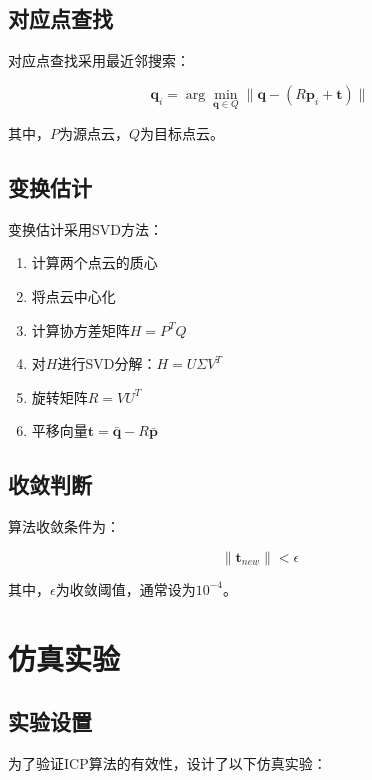 \documentclass[12pt,a4paper]{report}
\begin{document}
\subsection{对应点查找}

对应点查找采用最近邻搜索：

\begin{equation}
\mathbf{q}_i = \arg\min_{\mathbf{q} \in Q} \|\mathbf{q} - (R \mathbf{p}_i + \mathbf{t})\|
\end{equation}

其中，$P$为源点云，$Q$为目标点云。

\subsection{变换估计}

变换估计采用SVD方法：

\begin{enumerate}[itemsep=0pt]
    \item 计算两个点云的质心
    \item 将点云中心化
    \item 计算协方差矩阵$H = P^T Q$
    \item 对$H$进行SVD分解：$H = U \Sigma V^T$
    \item 旋转矩阵$R = V U^T$
    \item 平移向量$\mathbf{t} = \bar{\mathbf{q}} - R \bar{\mathbf{p}}$
\end{enumerate}

\subsection{收敛判断}

算法收敛条件为：

\begin{equation}
\|\mathbf{t}_{new}\| < \epsilon
\end{equation}

其中，$\epsilon$为收敛阈值，通常设为$10^{-4}$。

\section{仿真实验}

\subsection{实验设置}

为了验证ICP算法的有效性，设计了以下仿真实验：
\end{document}
